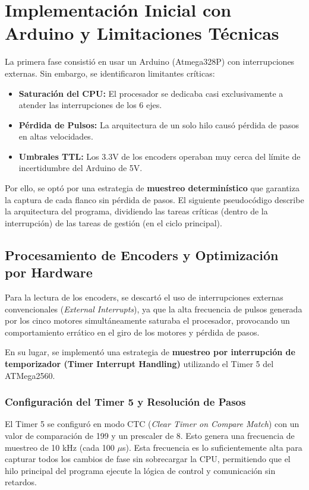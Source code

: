 \section{Implementación Inicial con Arduino y Limitaciones Técnicas}
La primera fase consistió en usar un Arduino (Atmega328P) con interrupciones externas. Sin embargo, se identificaron limitantes críticas:
\begin{itemize}
	\item \textbf{Saturación del CPU:} El procesador se dedicaba casi exclusivamente a atender las interrupciones de los 6 ejes.
	\item \textbf{Pérdida de Pulsos:} La arquitectura de un solo hilo causó pérdida de pasos en altas velocidades.
	\item \textbf{Umbrales TTL:} Los 3.3V de los encoders operaban muy cerca del límite de incertidumbre del Arduino de 5V.
\end{itemize}
Por ello, se optó por una estrategia de \textbf{muestreo determinístico} que garantiza la captura de cada flanco sin pérdida de pasos. El siguiente pseudocódigo describe la arquitectura del programa, dividiendo las tareas críticas (dentro de la interrupción) de las tareas de gestión (en el ciclo principal).

\subsection{Procesamiento de Encoders y Optimización por Hardware}

Para la lectura de los encoders, se descartó el uso de interrupciones externas convencionales (\textit{External Interrupts}), ya que la alta frecuencia de pulsos generada por los cinco motores simultáneamente saturaba el procesador, provocando un comportamiento errático en el giro de los motores y pérdida de pasos. 

En su lugar, se implementó una estrategia de \textbf{muestreo por interrupción de temporizador (Timer Interrupt Handling)} utilizando el Timer 5 del ATMega2560.

\subsubsection{Configuración del Timer 5 y Resolución de Pasos}
El Timer 5 se configuró en modo CTC (\textit{Clear Timer on Compare Match}) con un valor de comparación de 199 y un prescaler de 8. Esto genera una frecuencia de muestreo de 10 kHz (cada 100 $\mu$s). Esta frecuencia es lo suficientemente alta para capturar todos los cambios de fase sin sobrecargar la CPU, permitiendo que el hilo principal del programa ejecute la lógica de control y comunicación sin retardos.


